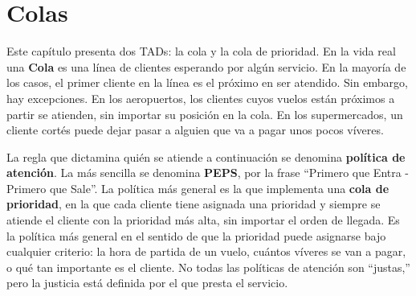 



\chapter{Colas}
\label{Cola}

Este capítulo presenta dos TADs: la cola y la cola de prioridad. En la 
vida real una {\bf Cola} es una línea de clientes esperando por algún 
servicio. En la mayoría de los casos, el primer cliente en la línea es
el próximo en ser atendido. Sin embargo, hay excepciones. En los 
aeropuertos, los clientes cuyos vuelos están próximos a partir 
se atienden, sin importar su posición en la cola. En los supermercados,
un cliente cortés puede dejar pasar a alguien que va a pagar unos 
pocos víveres.

La regla que dictamina quién se atiende a continuación se denomina
{\bf política de atención}.  La más sencilla se denomina 
 {\bf PEPS}, por la frase ``Primero que Entra - Primero que Sale''. La
política más general es la que implementa una {\bf cola de prioridad}, en
la que cada cliente tiene asignada una prioridad y siempre se atiende
el cliente con la prioridad más alta, sin importar el orden de llegada.
Es la política más general en el sentido de que la prioridad puede asignarse
bajo cualquier criterio: la hora de partida de un vuelo, cuántos víveres
se van a pagar, o qué tan importante es el cliente. No todas las 
políticas de atención son  ``justas,'' pero la justicia está definida
por el que presta el servicio.

